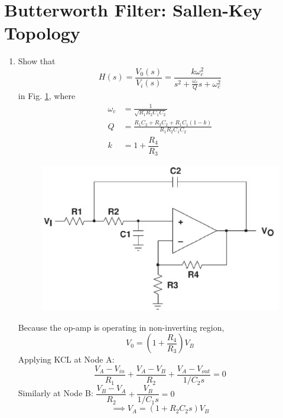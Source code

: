 \documentclass[journal,12pt,twocolumn]{IEEEtran}
\renewcommand\thesection{\arabic{section}}
\begin{document}
\section{Butterworth Filter: Sallen-Key Topology}
\begin{enumerate}[label=\thesection.\arabic*,ref=\thesection.\theenumi]
\item Show that 
\begin{equation}
\label{eq:tf}
H(s) = \frac{V_{0}(s)}{V_i(s)} = \frac{k\omega_{c}^{2}}{s^{2}+ \frac{\omega_{c}}{Q}s+\omega_{c}^{2}}
\end{equation}
in Fig. \ref{fig:butter},
where 
\begin{align}
\omega_c &= \frac{1}{\sqrt{R_{1}R_{2}C_{1}C_{2}}}
\\
Q &= \frac{R_{1}C_{2}+R_{2}C_{2}+R_{1}C_{1}(1-k)}{R_{1}R_{2}C_{1}C_{2}}
\\
k&=1+\dfrac{R_{4}}{R_{3}}
\end{align}
%
\begin{figure}[!ht]
\centering
\includegraphics[width=\columnwidth]{./figs/sallen_key_general.eps}
\caption{}
\label{fig:butter}
\end{figure}
\solution
Because the op-amp is operating in non-inverting region,
\begin{equation}
V_{0} = (1+\dfrac{R_{4}}{R_{3}})V_{B}
\end{equation}
Applying KCL at Node A:
\begin{equation}
\dfrac{V_{A}-V_{in}}{R_{1}} + \dfrac{V_{A}-V_{B}}{R_{2}} + \dfrac{V_{A}-V_{out}}{1/C_{2}s} = 0
\end{equation}
Similarly at Node B:
$\dfrac{V_{B}-V_{A}}{R_{2}} + \dfrac{V_{B}}{1/C_{1}s}=0$
\begin{equation}
\implies V_{A}=(1+R_{2}C_{2}s)V_{B}
\end{equation}

\end{enumerate}
\end{document}
